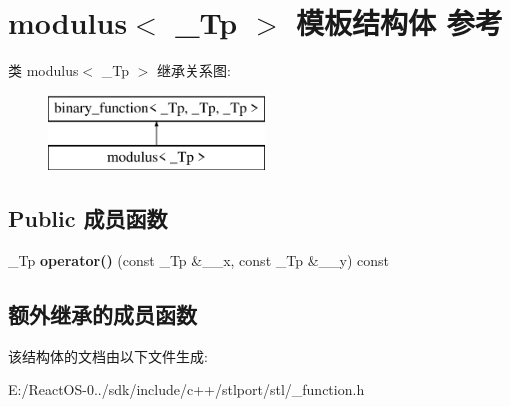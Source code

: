 \hypertarget{structmodulus}{}\section{modulus$<$ \+\_\+\+Tp $>$ 模板结构体 参考}
\label{structmodulus}
类 modulus$<$ \+\_\+\+Tp $>$ 继承关系图\+:\begin{figure}[H]
\begin{center}
\leavevmode
\includegraphics[height=2.000000cm]{structmodulus}
\end{center}
\end{figure}
\subsection*{Public 成员函数}
\begin{DoxyCompactItemize}
\item 
\mbox{\label{structmodulus_a56ba5c5dc48888dadf4835b35b080339}} 
\+\_\+\+Tp {\bfseries operator()} (const \+\_\+\+Tp \&\+\_\+\+\_\+x, const \+\_\+\+Tp \&\+\_\+\+\_\+y) const
\end{DoxyCompactItemize}
\subsection*{额外继承的成员函数}


该结构体的文档由以下文件生成\+:\begin{DoxyCompactItemize}
\item 
E\+:/\+React\+O\+S-\/0../sdk/include/c++/stlport/stl/\+\_\+function.\+h\end{DoxyCompactItemize}
